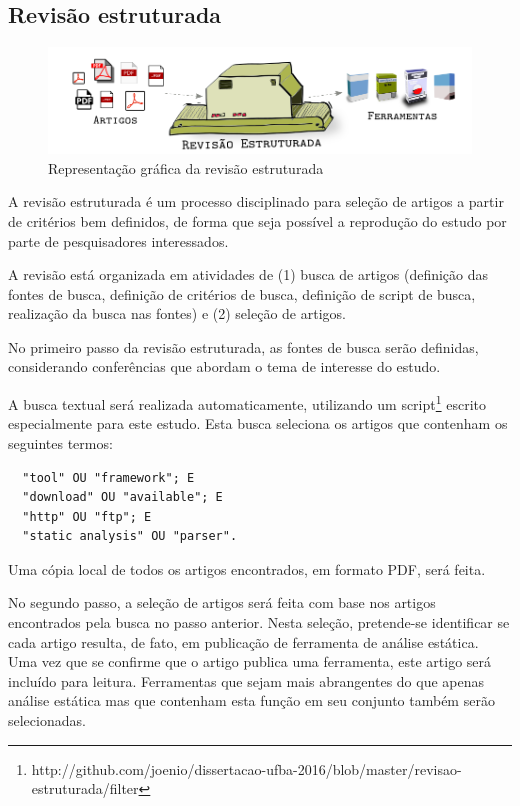 
\subsection{Revisão estruturada} \label{revisao-estruturada}

\begin{figure}[h]
  \center
  \includegraphics[scale=0.33]{imagens/revisao-estruturada.png}
  \caption{Representação gráfica da revisão estruturada}
  \label{figura-revisao-estruturada}
\end{figure}

A revisão estruturada é um processo disciplinado para seleção de artigos a
partir de critérios bem definidos, de forma que seja possível a reprodução do
estudo por parte de pesquisadores interessados.

A revisão está organizada em atividades de (1) busca de artigos (definição
das fontes de busca, definição de critérios de busca, definição de script de
busca, realização da busca nas fontes) e (2) seleção de artigos. 

No primeiro passo da revisão estruturada, as fontes de busca serão definidas,
considerando conferências que abordam o tema de interesse do estudo. 

A busca textual será realizada automaticamente, utilizando um
script\footnote{http://github.com/joenio/dissertacao-ufba-2016/blob/master/revisao-estruturada/filter}
escrito especialmente para este estudo. Esta busca seleciona os artigos que
contenham os seguintes termos:

\begin{verbatim}
  "tool" OU "framework"; E
  "download" OU "available"; E
  "http" OU "ftp"; E
  "static analysis" OU "parser".
\end{verbatim}

Uma cópia local de todos os artigos encontrados, em formato PDF, será feita.

No segundo passo, a seleção de artigos será feita com base nos artigos
encontrados pela busca no passo anterior.  Nesta seleção, pretende-se
identificar se cada artigo resulta, de fato, em publicação de ferramenta de
análise estática. Uma vez que se confirme que o artigo publica uma
ferramenta, este artigo será incluído para leitura. Ferramentas que sejam
mais abrangentes do que apenas análise estática mas que contenham esta função
em seu conjunto também serão selecionadas.

